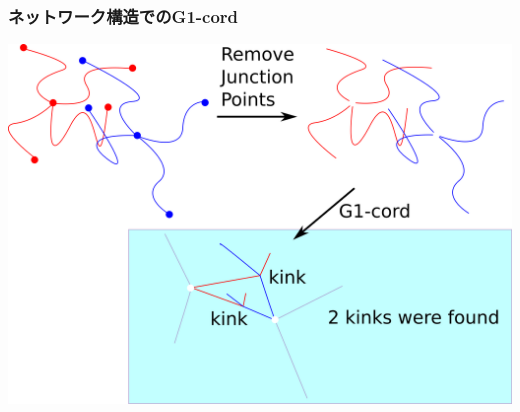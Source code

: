 \documentclass[12pt, dvipdfmx]{beamer}
\begin{document}

\begin{frame}
	\frametitle{ネットワーク構造でのG1-cord}
		\begin{center}
			\includegraphics[width=.8\textwidth]{g1cord.png}
		\end{center}
\end{frame}

\end{document}
